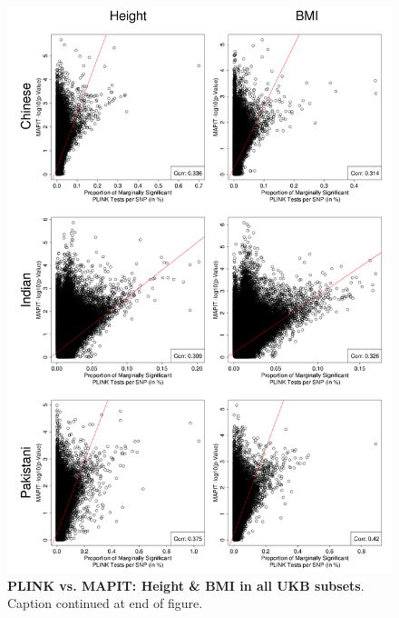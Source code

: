 \documentclass[12pt, a4paper]{article}
\begin{document}
\setlength{\footskip}{3cm}
\begin{figure}[htbp]
\centering
\vspace*{-2cm}
\includegraphics[scale=.3]{Images/Supp/InterPath_Supp_Figure_PLINKvsMAPIT_vs3_AllPops_HeightBMI_pt2.png}
\caption[TBD]{\textbf{PLINK vs. MAPIT: Height \& BMI in all UKB subsets}. Caption continued at end of figure.}
\label{InterPath-Supp-Figure-MAPITvsPLINK-HeightBMI-AllPops-b}
\end{figure}
\clearpage
\setlength{\footskip}{1cm}
\addtocounter{figure}{-1}
\end{document}
